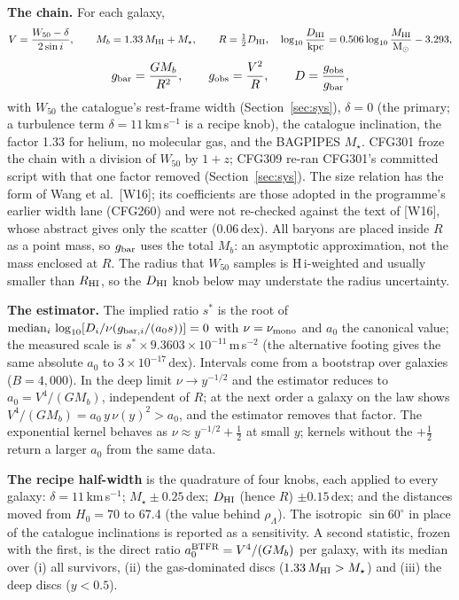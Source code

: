 \documentclass[10pt]{article}
\begin{document}
\textbf{The chain.} For each galaxy,
\begin{equation*}
V=\frac{W_{50}-\delta}{2\sin i},\qquad M_b=1.33\,M_{\rm HI}+M_\star,\qquad R=\tfrac12D_{\rm HI},\quad \log_{10}\frac{D_{\rm HI}}{\rm kpc}=0.506\log_{10}\frac{M_{\rm HI}}{\rm M_\odot}-3.293,
\end{equation*}
\begin{equation*}
g_{\rm bar}=\frac{GM_b}{R^2},\qquad g_{\rm obs}=\frac{V^2}{R},\qquad D=\frac{g_{\rm obs}}{g_{\rm bar}},
\end{equation*}
with $W_{50}$ the catalogue's rest-frame width (Section~\ref{sec:sys}), $\delta=0$ (the primary; a turbulence term $\delta=11$\,km\,s$^{-1}$ is a recipe knob), the catalogue inclination, the factor 1.33 for helium, no molecular gas, and the BAGPIPES $M_\star$. CFG301 froze the chain with a division of $W_{50}$ by $1+z$; CFG309 re-ran CFG301's committed script with that one factor removed (Section~\ref{sec:sys}). The size relation has the form of Wang et al.\ [W16]; its coefficients are those adopted in the programme's earlier width lane (CFG260) and were not re-checked against the text of [W16], whose abstract gives only the scatter (0.06\,dex). All baryons are placed inside $R$ as a point mass, so $g_{\rm bar}$ uses the total $M_b$: an asymptotic approximation, not the mass enclosed at $R$. The radius that $W_{50}$ samples is H\,{\sc i}-weighted and usually smaller than $R_{\rm HI}$, so the $D_{\rm HI}$ knob below may understate the radius uncertainty.

\textbf{The estimator.} The implied ratio $s^*$ is the root of $\mathrm{median}_i\,\log_{10}[D_i/\nu(g_{{\rm bar},i}/(a_0s))]=0$ with $\nu=\nu_{\rm mono}$ and $a_0$ the canonical value; the measured scale is $s^*\times9.3603\times10^{-11}$\,m\,s$^{-2}$ (the alternative footing gives the same absolute $a_0$ to $3\times10^{-17}$\,dex). Intervals come from a bootstrap over galaxies ($B=4{,}000$). In the deep limit $\nu\to y^{-1/2}$ and the estimator reduces to $a_0=V^4/(GM_b)$, independent of $R$; at the next order a galaxy on the law shows $V^4/(GM_b)=a_0\,y\,\nu(y)^2>a_0$, and the estimator removes that factor. The exponential kernel behaves as $\nu\approx y^{-1/2}+\tfrac12$ at small $y$; kernels without the $+\tfrac12$ return a larger $a_0$ from the same data.

\textbf{The recipe half-width} is the quadrature of four knobs, each applied to every galaxy: $\delta=11$\,km\,s$^{-1}$; $M_\star\pm0.25$\,dex; $D_{\rm HI}$ (hence $R$) $\pm0.15$\,dex; and the distances moved from $H_0=70$ to 67.4 (the value behind $\rho_\Lambda$). The isotropic $\sin60^\circ$ in place of the catalogue inclinations is reported as a sensitivity. A second statistic, frozen with the first, is the direct ratio $a_0^{\rm BTFR}=V^4/(GM_b)$ per galaxy, with its median over (i) all survivors, (ii) the gas-dominated discs ($1.33\,M_{\rm HI}>M_\star$) and (iii) the deep discs ($y<0.5$).
\end{document}
